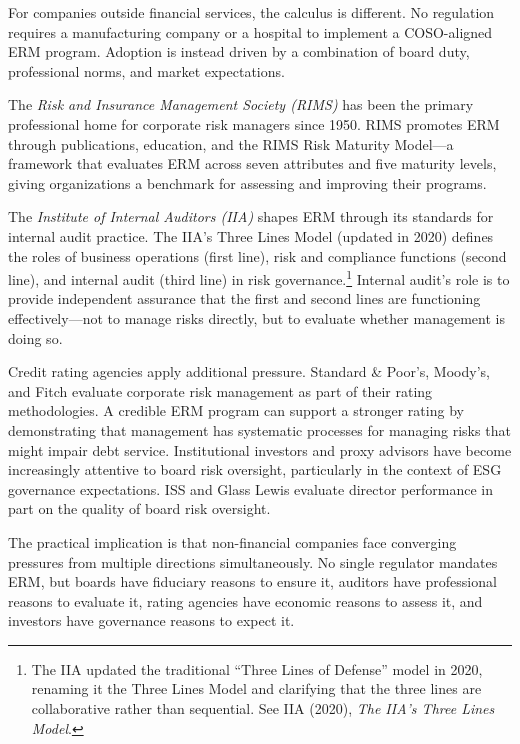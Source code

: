 \documentclass[11pt,openany]{book}
\begin{document}
For companies outside financial services, the calculus is different. No regulation requires a manufacturing company or a hospital to implement a COSO-aligned ERM program. Adoption is instead driven by a combination of board duty, professional norms, and market expectations.

The \emph{Risk and Insurance Management Society (RIMS)} has been the primary professional home for corporate risk managers since 1950. RIMS promotes ERM through publications, education, and the RIMS Risk Maturity Model---a framework that evaluates ERM across seven attributes and five maturity levels, giving organizations a benchmark for assessing and improving their programs.

The \emph{Institute of Internal Auditors (IIA)} shapes ERM through its standards for internal audit practice. The IIA's Three Lines Model (updated in 2020) defines the roles of business operations (first line), risk and compliance functions (second line), and internal audit (third line) in risk governance.\footnote{The IIA updated the traditional ``Three Lines of Defense'' model in 2020, renaming it the Three Lines Model and clarifying that the three lines are collaborative rather than sequential. See IIA (2020), \emph{The IIA's Three Lines Model}.} Internal audit's role is to provide independent assurance that the first and second lines are functioning effectively---not to manage risks directly, but to evaluate whether management is doing so.

Credit rating agencies apply additional pressure. Standard \& Poor's, Moody's, and Fitch evaluate corporate risk management as part of their rating methodologies. A credible ERM program can support a stronger rating by demonstrating that management has systematic processes for managing risks that might impair debt service. Institutional investors and proxy advisors have become increasingly attentive to board risk oversight, particularly in the context of ESG governance expectations. ISS and Glass Lewis evaluate director performance in part on the quality of board risk oversight.

The practical implication is that non-financial companies face converging pressures from multiple directions simultaneously. No single regulator mandates ERM, but boards have fiduciary reasons to ensure it, auditors have professional reasons to evaluate it, rating agencies have economic reasons to assess it, and investors have governance reasons to expect it.
\end{document}
